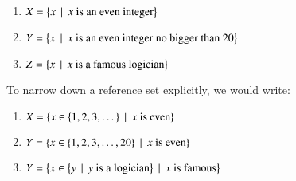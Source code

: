 \documentclass[nobib,nofonts]{tufte-handout}
\begin{document}
\begin{enumerate}[]
\item $X = \left\{x \thinspace \mid \thinspace \text{$x$ is an even integer}\right\}$
\item $Y = \left\{x \thinspace \mid \thinspace \text{$x$ is an even integer no bigger than 20}\right\}$
\item $Z = \left\{x \thinspace \mid \thinspace \text{$x$ is a famous logician}\right\}$
\end{enumerate}

\noindent To narrow down a reference set explicitly, we would write:

\begin{enumerate}[]
\item $X = \left\{x \in \left\{1, 2, 3, \dots\right\} \thinspace \mid \thinspace \text{$x$ is even}\right\}$
\item $Y = \left\{x \in \left\{1, 2, 3, \dots, 20\right\} \thinspace \mid \thinspace \text{$x$ is even}\right\}$
\item $Y = \left\{x \in \left\{y \thinspace \mid \thinspace \text{$y$ is a logician}\right\} \thinspace \mid \thinspace \text{$x$ is famous}\right\}$
\end{enumerate}
\end{document}
